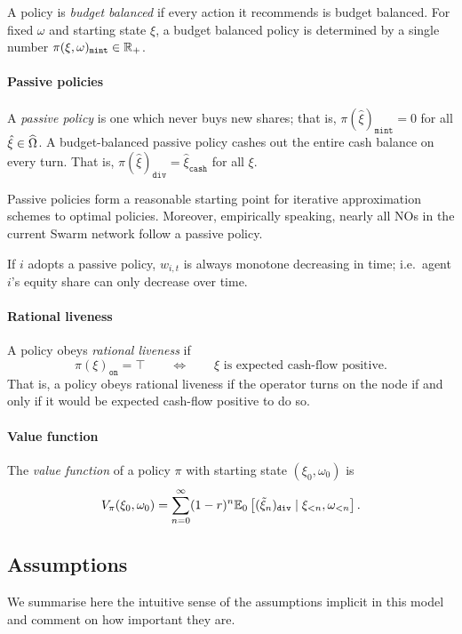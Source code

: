 A policy is \emph{budget balanced} if every action it recommends is budget balanced.
%
For fixed $\omega$ and starting state $\xi$, a budget balanced policy is determined by a single number $\pi(\xi,\omega)_\mathtt{mint}\in\mathbb{R}_+$.

\paragraph{Passive policies}
%
A \emph{passive policy} is one which never buys new shares; that is, $\pi(\hat\xi)_\mathtt{mint}=0$ for all $\hat\xi\in\widehat{\Omega}$.
%
A budget-balanced passive policy cashes out the entire cash balance on every turn. 
%
That is, $\pi(\hat\xi)_\mathtt{div}=\hat\xi_\mathtt{cash}$ for all $\xi$.

Passive policies form a reasonable starting point for iterative approximation schemes to optimal policies.
%
Moreover, empirically speaking, nearly all NOs in the current Swarm network follow a passive policy.

If $i$ adopts a passive policy, $w_{i,t}$ is always monotone decreasing in time; i.e.~agent $i$'s equity share can only decrease over time.

\paragraph{Rational liveness}
%
A policy obeys \emph{rational liveness} if 
\[
  \pi(\xi)_\mathtt{on} = \top \qquad \Leftrightarrow \qquad \xi\text{ is expected cash-flow positive}.
\]
That is, a policy obeys rational liveness if the operator turns on the node if and only if it would be expected cash-flow positive to do so.

\paragraph{Value function}
The \emph{value function} of a policy $\pi$ with starting state $(\xi_0,\omega_0)$ is
\[
  V_\pi(\xi_0,\omega_0) = \sum_{n=0}^\infty (1-r)^n\mathbb{E}_0 \left[ (\tilde{\xi}_n)_\mathtt{div} \mid \xi_{<n}, \omega_{<n}\right].
\]


\subsection{Assumptions}

We summarise here the intuitive sense of the assumptions implicit in this model and comment on how important they are.

